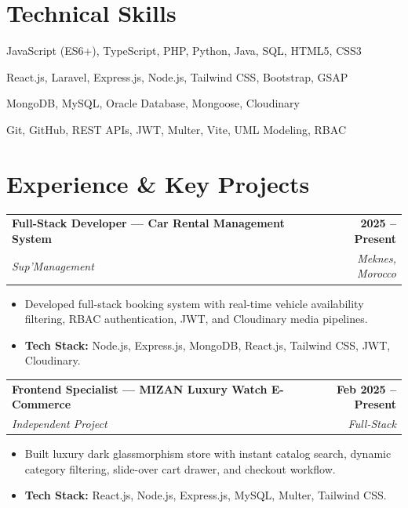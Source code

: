 \documentclass[a4paper,10pt]{article}
\makeatletter
\newcommand{\experienceHeader}[4]{
  \noindent
  \begin{tabularx}{\textwidth}{@{}X r@{}}
    \textbf{\color{primary} #1} & \textbf{\color{textdark}\small #2} \\
    \textit{\small\color{textgray} #3} & \textit{\small\color{textgray} #4} \\
  \end{tabularx}
  \vspace{-3pt}
}
\makeatother
\begin{document}
\section{Technical Skills}
\begin{description}[font=\normalfont\bfseries\color{primary}, leftmargin=0pt, style=nextline, labelsep=0pt]
    \item[Languages:] JavaScript (ES6+), TypeScript, PHP, Python, Java, SQL, HTML5, CSS3
    \item[Frameworks \& Libraries:] React.js, Laravel, Express.js, Node.js, Tailwind CSS, Bootstrap, GSAP
    \item[Databases \& Cloud:] MongoDB, MySQL, Oracle Database, Mongoose, Cloudinary
    \item[Tools \& Practices:] Git, GitHub, REST APIs, JWT, Multer, Vite, UML Modeling, RBAC
\end{description}

\section{Experience \& Key Projects}

\experienceHeader{Full-Stack Developer --- Car Rental Management System}{2025 -- Present}{Sup'Management}{Meknes, Morocco}
\begin{itemize}
    \item Developed full-stack booking system with real-time vehicle availability filtering, RBAC authentication, JWT, and Cloudinary media pipelines.
    \item \textbf{Tech Stack:} Node.js, Express.js, MongoDB, React.js, Tailwind CSS, JWT, Cloudinary.
\end{itemize}

\vspace{3pt}

\experienceHeader{Frontend Specialist --- MIZAN Luxury Watch E-Commerce}{Feb 2025 -- Present}{Independent Project}{Full-Stack}
\begin{itemize}
    \item Built luxury dark glassmorphism store with instant catalog search, dynamic category filtering, slide-over cart drawer, and checkout workflow.
    \item \textbf{Tech Stack:} React.js, Node.js, Express.js, MySQL, Multer, Tailwind CSS.
\end{itemize}
\end{document}
